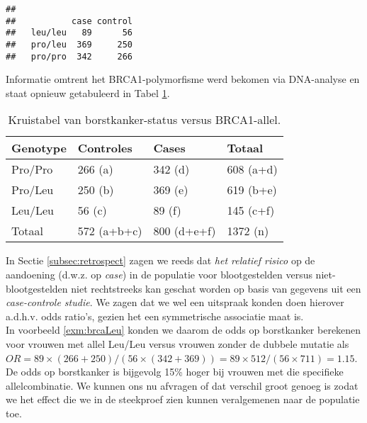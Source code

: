 \documentclass[
  12pt,dutch,coursenotes]{book}
\newenvironment{Shaded}{\begin{snugshade}}{\end{snugshade}}
\newcommand{\KeywordTok}[1]{\textcolor[rgb]{0.13,0.29,0.53}{\textbf{#1}}}
\newcommand{\NormalTok}[1]{#1}
\newcommand{\OperatorTok}[1]{\textcolor[rgb]{0.81,0.36,0.00}{\textbf{#1}}}
\newcommand{\StringTok}[1]{\textcolor[rgb]{0.31,0.60,0.02}{#1}}
\theoremstyle{definition}
\theoremstyle{definition}
\theoremstyle{definition}
\theoremstyle{remark}
\begin{document}
\begin{Shaded}
\end{Shaded}

\begin{verbatim}
##          
##           case control
##   leu/leu   89      56
##   pro/leu  369     250
##   pro/pro  342     266
\end{verbatim}

Informatie omtrent het BRCA1-polymorfisme werd bekomen via DNA-analyse en staat opnieuw getabuleerd in Tabel \ref{tab:leu3}.

\begin{table}

\caption{\label{tab:leu3}Kruistabel van borstkanker-status versus BRCA1-allel.}
\centering
\begin{tabular}[t]{llll}
\toprule
Genotype & Controles & Cases & Totaal\\
\midrule
Pro/Pro & 266 (a) & 342 (d) & 608 (a+d)\\
Pro/Leu & 250 (b) & 369 (e) & 619 (b+e)\\
Leu/Leu & 56 (c) & 89 (f) & 145 (c+f)\\
Totaal & 572 (a+b+c) & 800 (d+e+f) & 1372 (n)\\
\bottomrule
\end{tabular}
\end{table}

In Sectie \ref{subsec:retrospect} zagen we reeds dat \emph{het relatief risico} op de aandoening (d.w.z. op \emph{case})
in de populatie voor blootgestelden versus niet-blootgestelden niet rechtstreeks kan geschat worden op basis van gegevens uit een \emph{case-controle studie}.
We zagen dat we wel een uitspraak konden doen hierover a.d.h.v. odds ratio's, gezien het een symmetrische associatie maat is.\\
In voorbeeld \ref{exm:brcaLeu} konden we daarom de odds op borstkanker berekenen voor vrouwen met allel Leu/Leu
versus vrouwen zonder de dubbele mutatie als \(OR=89\times (266+250)/(56\times (342+369))=89\times 512/(56 \times 711)=1.15\).
De odds op borstkanker is bijgevolg 15\% hoger bij vrouwen met die specifieke allelcombinatie.
We kunnen ons nu afvragen of dat verschil groot genoeg is zodat we het effect die we in de steekproef zien kunnen veralgemenen naar de populatie toe.
\end{document}
